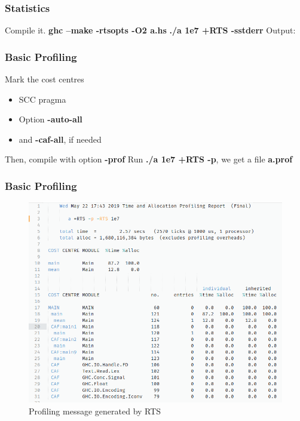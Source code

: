 \documentclass{beamer}
\newcommand{\inlineshell}[1]{\textcolor{shellcolor}{\textbf{#1}}}
\begin{document}

\begin{frame}
\frametitle{Statistics}
Compile it.\newline
\inlineshell{ghc --make -rtsopts -O2 a.hs}\newline\bigskip
\inlineshell{./a 1e7 +RTS -sstderr}\newline
Output:\newline
{}

\end{frame}


\begin{frame}
\frametitle{Basic Profiling}
Mark the cost centres
\begin{itemize}
    \item SCC pragma
    \item Option \inlineshell{-auto-all}
    \item and \inlineshell{-caf-all}, if needed
\end{itemize}\bigskip

Then, compile with option \inlineshell{-prof}\newline
Run \inlineshell{./a 1e7 +RTS -p}, we get a file \inlineshell{a.prof}
\end{frame}


\begin{frame}
\frametitle{Basic Profiling}
\begin{figure}[hbt!]
\begin{center}
\includegraphics[height=0.7\textheight]{./pic/profiling.png}
\caption{Profiling message generated by RTS}
\end{center}
\end{figure}
\end{frame}
\end{document}
